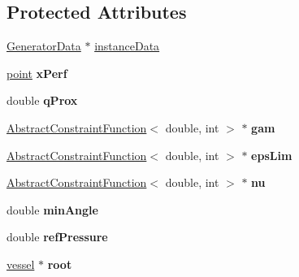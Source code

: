 \subsection*{Protected Attributes}
\begin{DoxyCompactItemize}
\item 
\mbox{\hyperlink{class_generator_data}{Generator\+Data}} $\ast$ \mbox{\hyperlink{class_abstract_c_c_o_tree_afd240b7fad46ddf0a2ed78558cc9b9ca}{instance\+Data}}
\item 
\mbox{\label{class_abstract_c_c_o_tree_aa226d269ca18a2dcce950780ca59ef52}} 
\mbox{\hyperlink{structpoint}{point}} {\bfseries x\+Perf}
\item 
\mbox{\label{class_abstract_c_c_o_tree_a09b4eb834c2fb32396b96585717b56f8}} 
double {\bfseries q\+Prox}
\item 
\mbox{\label{class_abstract_c_c_o_tree_a02dcda60ad9361215133de06d7cf7e41}} 
\mbox{\hyperlink{class_abstract_constraint_function}{Abstract\+Constraint\+Function}}$<$ double, int $>$ $\ast$ {\bfseries gam}
\item 
\mbox{\label{class_abstract_c_c_o_tree_a8127a765ee0a8f8a22a730d39af816b5}} 
\mbox{\hyperlink{class_abstract_constraint_function}{Abstract\+Constraint\+Function}}$<$ double, int $>$ $\ast$ {\bfseries eps\+Lim}
\item 
\mbox{\label{class_abstract_c_c_o_tree_a6ab0b31d4ce33376700b2750ba3a7db8}} 
\mbox{\hyperlink{class_abstract_constraint_function}{Abstract\+Constraint\+Function}}$<$ double, int $>$ $\ast$ {\bfseries nu}
\item 
\mbox{\label{class_abstract_c_c_o_tree_a186e8d204163b83e9a2b73f4336b056a}} 
double {\bfseries min\+Angle}
\item 
\mbox{\label{class_abstract_c_c_o_tree_aae5a41f25d5747f5025a7f08b5253a8b}} 
double {\bfseries ref\+Pressure}
\item 
\mbox{\label{class_abstract_c_c_o_tree_a2cc91ae3ffd2529000054137825f6c59}} 
\mbox{\hyperlink{structvessel}{vessel}} $\ast$ {\bfseries root}

\end{DoxyCompactItemize}
